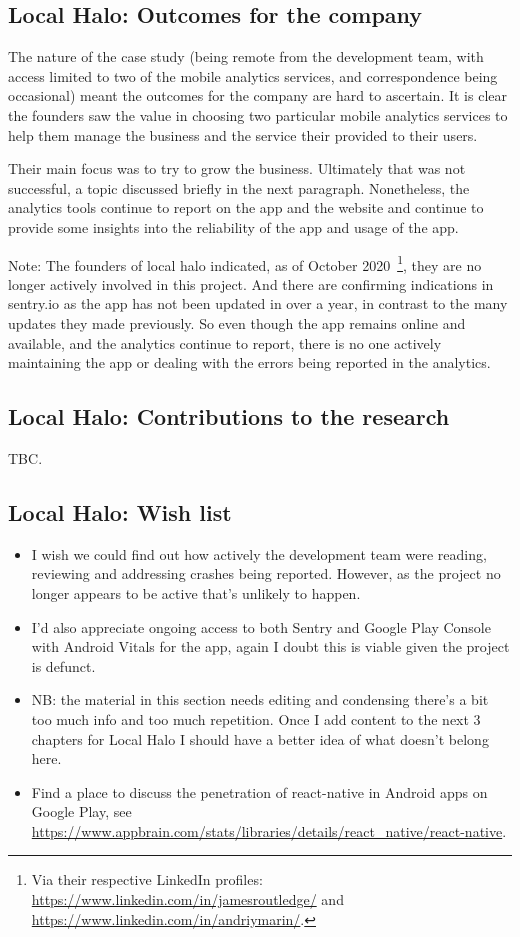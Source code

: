 \subsection{Local Halo: Outcomes for the company}
The nature of the case study (being remote from the development team, with access limited to two of the mobile analytics services, and correspondence being occasional) meant the outcomes for the company are hard to ascertain. It is clear the founders saw the value in choosing two particular mobile analytics services to help them manage the business and the service their provided to their users. 

Their main focus was to try to grow the business. Ultimately that was not successful, a topic discussed briefly in the next paragraph. Nonetheless, the analytics tools continue to report on the app and the website and continue to provide some insights into the reliability of the app and usage of the app.

Note: The founders of local halo indicated, as of October 2020~\footnote{Via their respective LinkedIn profiles: \url{https://www.linkedin.com/in/jamesroutledge/} and \url{https://www.linkedin.com/in/andriymarin/}.}, they are no longer actively involved in this project. And there are confirming indications in sentry.io as the app has not been updated in over a year, in contrast to the many updates they made previously. So even though the app remains online and available, and the analytics continue to report, there is no one actively maintaining the app or dealing with the errors being reported in the analytics.

\subsection{Local Halo: Contributions to the research}
TBC.

\subsection*{Local Halo: Wish list}
{\small
\begin{itemize}
    \itemsep0em
    \item I wish we could find out how actively the development team were reading, reviewing and addressing crashes being reported. However, as the project no longer appears to be active that's unlikely to happen.
    \item I'd also appreciate ongoing access to both Sentry and Google Play Console with Android Vitals for the app, again I doubt this is viable given the project is defunct.
    \item NB: the material in this section needs editing and condensing there's a bit too much info and too much repetition. Once I add content to the next 3 chapters for Local Halo I should have a better idea of what doesn't belong here.
    \item Find a place to discuss the penetration of react-native in Android apps on Google Play, see \url{https://www.appbrain.com/stats/libraries/details/react_native/react-native}.
\end{itemize}
}

